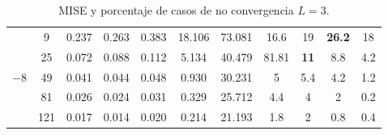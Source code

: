 \begin{table}[hbt]
\begin{tabular}{cc|SSSSS|SSSS}
		\cmidrule(r){1-7}
		\cmidrule(r){8-11}										
		&   9    	&  	  0.237  	&	  0.263  	&	  0.383  	&	  18.106  	&	  73.081  	&	 16.6 	&	 19 		&  \bfseries 26.2  &	 18  \\
		&   25   	&  	  0.072  	&	  0.088  	&	  0.112  	&	  5.134   	&	  40.479  	&	 81.81 	&    \bfseries 11 &	 8.8 		&	 4.2  \\
		&   49   	&  	  0.041  	&	  0.044  	&	  0.048  	&	  0.930   	&	  30.231  	&	 5 	    &	 5.4 		&	 4.2 		&	 1.2  \\
		&   81   	&  	  0.026  	&	  0.024  	&	  0.031  	&	  0.329   	&	  25.712  	&	 4.4 	&	 4 		    &	 2 		    &	 0.2  \\
		&   121  	&  	  0.017  	&	  0.014  	&	  0.020  	&	  0.214   	&	  21.193  	&	 1.8  	&	 2 		    &	 0.8 		&	 0.4  \\
		\bottomrule
	\end{tabular}										
\caption{\label{MiseyCantCasosNoConvergenciaL=3} MISE y porcentaje de casos de no convergencia $L=3$.}									
\end{table}	


